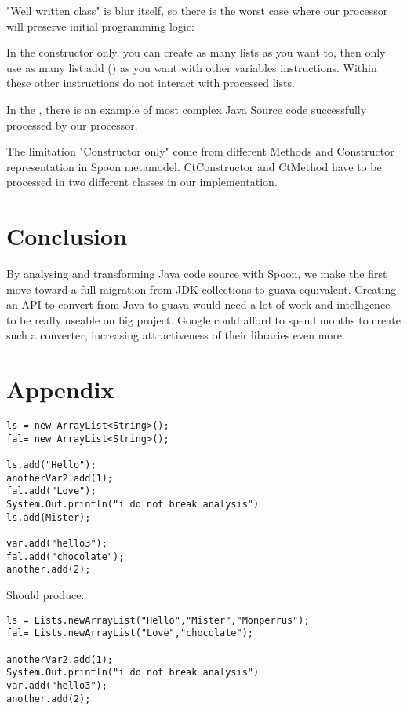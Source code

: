 \documentclass[paper=a4, fontsize=11pt]{scrartcl}
\numberwithin{equation}{section}%
\numberwithin{figure}{section}%
\numberwithin{table}{section}%
\begin{document}
"Well written class" is blur itself, so there is the worst case where
our processor will preserve initial programming logic:

In the constructor only, you can create as many lists as you want to,
then only use as many list.add () as you want with other variables
instructions. Within these other instructions do not interact with
processed lists.\newline

In the , there is an example of most complex Java Source code
successfully processed by our processor.\newline

The limitation "Constructor only" come from different Methods and
Constructor representation  in Spoon metamodel. CtConstructor and
CtMethod have to be processed in two different classes in our
implementation.

\section{Conclusion}

By analysing and transforming Java code source with Spoon, we make the
first move toward a full migration from JDK collections to guava
equivalent. Creating an API to convert from Java to guava would need a
lot of work and intelligence to be really useable on big
project. Google could afford to spend months to create such a
converter, increasing attractiveness of their libraries even more.  

\newpage
\appendix
\section{Appendix}
\label{app:one}
\begin{verbatim}
ls = new ArrayList<String>(); 
fal= new ArrayList<String>();

ls.add("Hello");
anotherVar2.add(1);
fal.add("Love");
System.Out.println("i do not break analysis")
ls.add(Mister);

var.add("hello3");
fal.add("chocolate");
another.add(2);
\end{verbatim}
Should produce:
\begin{verbatim}
ls = Lists.newArrayList("Hello","Mister","Monperrus"); 
fal= Lists.newArrayList("Love","chocolate");

anotherVar2.add(1);
System.Out.println("i do not break analysis")
var.add("hello3");
another.add(2);
\end{verbatim}
\end{document}
